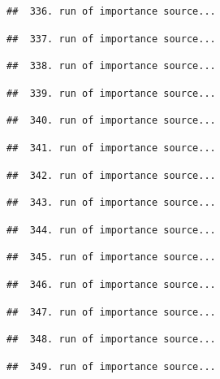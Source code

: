 \documentclass[
]{article}
\begin{document}
\begin{verbatim}
##  336. run of importance source...
\end{verbatim}

\begin{verbatim}
##  337. run of importance source...
\end{verbatim}

\begin{verbatim}
##  338. run of importance source...
\end{verbatim}

\begin{verbatim}
##  339. run of importance source...
\end{verbatim}

\begin{verbatim}
##  340. run of importance source...
\end{verbatim}

\begin{verbatim}
##  341. run of importance source...
\end{verbatim}

\begin{verbatim}
##  342. run of importance source...
\end{verbatim}

\begin{verbatim}
##  343. run of importance source...
\end{verbatim}

\begin{verbatim}
##  344. run of importance source...
\end{verbatim}

\begin{verbatim}
##  345. run of importance source...
\end{verbatim}

\begin{verbatim}
##  346. run of importance source...
\end{verbatim}

\begin{verbatim}
##  347. run of importance source...
\end{verbatim}

\begin{verbatim}
##  348. run of importance source...
\end{verbatim}

\begin{verbatim}
##  349. run of importance source...
\end{verbatim}
\end{document}
